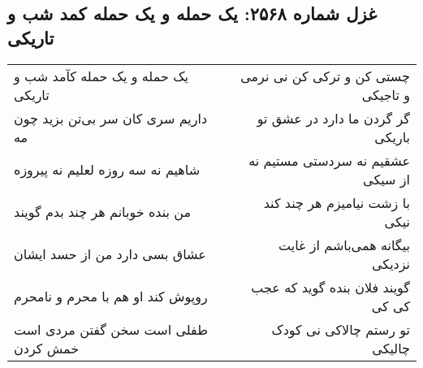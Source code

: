 \begin{center}
\section*{غزل شماره ۲۵۶۸: یک حمله و یک حمله کمد شب و تاریکی}
\label{sec:2568}
\begin{longtable}{l p{0.5cm} r}
یک حمله و یک حمله کآمد شب و تاریکی
&&
چستی کن و ترکی کن نی نرمی و تاجیکی
\\
داریم سری کان سر بی‌تن بزید چون مه
&&
گر گردن ما دارد در عشق تو باریکی
\\
شاهیم نه سه روزه لعلیم نه پیروزه
&&
عشقیم نه سردستی مستیم نه از سیکی
\\
من بنده خوبانم هر چند بدم گویند
&&
با زشت نیامیزم هر چند کند نیکی
\\
عشاق بسی دارد من از حسد ایشان
&&
بیگانه همی‌باشم از غایت نزدیکی
\\
روپوش کند او هم با محرم و نامحرم
&&
گویند فلان بنده گوید که عجب کی کی
\\
طفلی است سخن گفتن مردی است خمش کردن
&&
تو رستم چالاکی نی کودک چالیکی
\\
\end{longtable}
\end{center}
